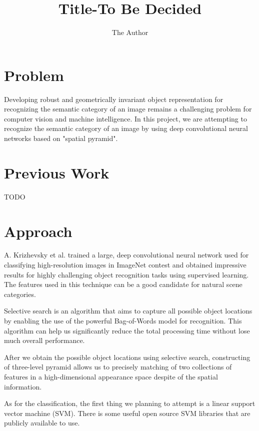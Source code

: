 \documentclass[letterpaper,twocolumn,11pt]{article}
\title{Title-To Be Decided}
\author{The Author}
\date{} %
\begin{document}
\maketitle

\section{Problem}
	Developing robust and geometrically invariant object representation for
	recognizing the semantic category of an image remains a challenging problem
	for computer vision and machine intelligence. In this project, we are
	attempting to recognize the	semantic category of an	image by using deep
	convolutional neural networks based on "spatial pyramid".

\section{Previous Work}
TODO

\section{Approach}
\par
	A. Krizhevsky et al.\cite{CNN} trained a large, deep convolutional neural
	network used for classifying high-resolution images in ImageNet contest
	and obtained impressive results for highly challenging object recognition
	tasks using	supervised learning. The features used in this technique can
	be a good candidate for natural scene categories.

\par
	Selective search\cite{SS} is an algorithm that aims to capture all possible
	object locations by enabling the use of the powerful Bag-of-Words model
	for recognition. This algorithm can help us significantly reduce the total
	processing time without lose much overall performance.

\par
	After we obtain the possible object locations using selective search,
	constructing of three-level pyramid allows us to precisely matching of two
	collections of features in a high-dimensional appearance space despite
	of the spatial information.\cite{SPM}

\par
	As for the classification, the first thing we planning to attempt is a
	linear support vector machine (SVM).\cite{SVM} There is some useful
	open source SVM libraries that are publicly available to use.
\end{document}
